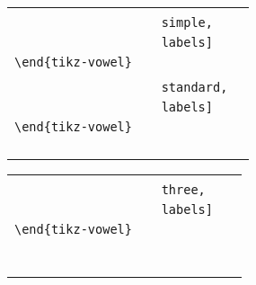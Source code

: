 \documentclass{article}
\begin{document}
\begin{center}
\begin{tabular}{ll}
  \begin{minipage}[t]{6.5cm}{\small
    \verb|\begin{tikz-vowel}[rectangle,|\\
    \verb|                    simple,|\\
    \verb|                    labels]|\\
    \verb|\end{tikz-vowel}|\\}
  \end{minipage} &
  \begin{minipage}[t]{6.5cm}{\small
    \verb|\begin{tikz-vowel}[rectangle,|\\
    \verb|                    standard,|\\
    \verb|                    labels]|\\
    \verb|\end{tikz-vowel}|\\}
  \end{minipage} \\
  \begin{minipage}[t]{6.5cm}{
  \hspace*{-1.75cm}
  \begin{tikz-vowel}\end{tikz-vowel} \\}\end{minipage} &
  \begin{minipage}[t]{6.5cm}{
  \hspace*{-1.5cm}
  \begin{tikz-vowel}\end{tikz-vowel} \\}\end{minipage}
\end{tabular}

\bigskip

\begin{tabular}{ll}
  \begin{minipage}[t]{6.5cm}{\small
    \verb|\begin{tikz-vowel}[rectangle,|\\
    \verb|                    three,|\\
    \verb|                    labels]|\\
    \verb|\end{tikz-vowel}|\\}
  \end{minipage} & 
  \begin{minipage}[t]{6.5cm}
  {~}
  \end{minipage} \\
  \begin{minipage}[t]{6.5cm}{
  \hspace*{-1.75cm}
  \begin{tikz-vowel}\end{tikz-vowel} \\}\end{minipage} &
\end{tabular}
\end{center}
\end{document}
